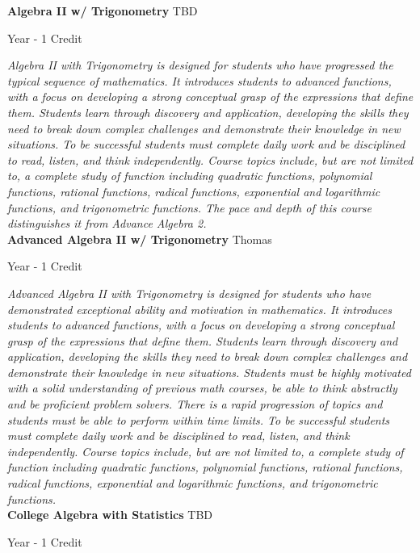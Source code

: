 \noindent\textbf{Algebra II w/ Trigonometry} \hfill TBD

\noindent Year - 1 Credit

\vspace{1mm}\emph{Algebra II with Trigonometry is designed for students who have progressed the typical sequence of mathematics. It introduces students to advanced functions, with a focus on developing a strong conceptual grasp of the expressions that define them. Students learn through discovery and application, developing the skills they need to break down complex challenges and demonstrate their knowledge in new situations. To be successful students must complete daily work and be disciplined to read, listen, and think independently. Course topics include, but are not limited to, a complete study of function including quadratic functions, polynomial functions, rational functions, radical functions, exponential and logarithmic functions, and trigonometric functions. The pace and depth of this course distinguishes it from Advance Algebra 2.}\\

\noindent\textbf{Advanced Algebra II w/ Trigonometry} \hfill Thomas

\noindent Year - 1 Credit

\vspace{1mm}\emph{Advanced Algebra II with Trigonometry is designed for students who have demonstrated exceptional ability and motivation in mathematics. It introduces students to advanced functions, with a focus on developing a strong conceptual grasp of the expressions that define them. Students learn through discovery and application, developing the skills they need to break down complex challenges and demonstrate their knowledge in new situations. Students must be highly motivated with a solid understanding of previous math courses, be able to think abstractly and be proficient problem solvers. There is a rapid progression of topics and students must be able to perform within time limits. To be successful students must complete daily work and be disciplined to read, listen, and think independently. Course topics include, but are not limited to, a complete study of function including quadratic functions, polynomial functions, rational functions, radical functions, exponential and logarithmic functions, and trigonometric functions.}\\

\noindent\textbf{College Algebra with Statistics} \hfill TBD

\noindent Year - 1 Credit

